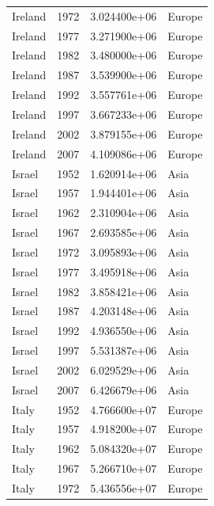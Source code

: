 \documentclass[
  letterpaper,
  DIV=11,
  numbers=noendperiod]{scrreprt}
\begin{document}
\begin{tcolorbox}
\begin{tabular}{lrrl}
Ireland                  &  1972 &  3.024400e+06 &    Europe \\
Ireland                  &  1977 &  3.271900e+06 &    Europe \\
Ireland                  &  1982 &  3.480000e+06 &    Europe \\
Ireland                  &  1987 &  3.539900e+06 &    Europe \\
Ireland                  &  1992 &  3.557761e+06 &    Europe \\
Ireland                  &  1997 &  3.667233e+06 &    Europe \\
Ireland                  &  2002 &  3.879155e+06 &    Europe \\
Ireland                  &  2007 &  4.109086e+06 &    Europe \\
Israel                   &  1952 &  1.620914e+06 &      Asia \\
Israel                   &  1957 &  1.944401e+06 &      Asia \\
Israel                   &  1962 &  2.310904e+06 &      Asia \\
Israel                   &  1967 &  2.693585e+06 &      Asia \\
Israel                   &  1972 &  3.095893e+06 &      Asia \\
Israel                   &  1977 &  3.495918e+06 &      Asia \\
Israel                   &  1982 &  3.858421e+06 &      Asia \\
Israel                   &  1987 &  4.203148e+06 &      Asia \\
Israel                   &  1992 &  4.936550e+06 &      Asia \\
Israel                   &  1997 &  5.531387e+06 &      Asia \\
Israel                   &  2002 &  6.029529e+06 &      Asia \\
Israel                   &  2007 &  6.426679e+06 &      Asia \\
Italy                    &  1952 &  4.766600e+07 &    Europe \\
Italy                    &  1957 &  4.918200e+07 &    Europe \\
Italy                    &  1962 &  5.084320e+07 &    Europe \\
Italy                    &  1967 &  5.266710e+07 &    Europe \\
Italy                    &  1972 &  5.436556e+07 &    Europe \\

\end{tabular}
\end{tcolorbox}
\end{document}

